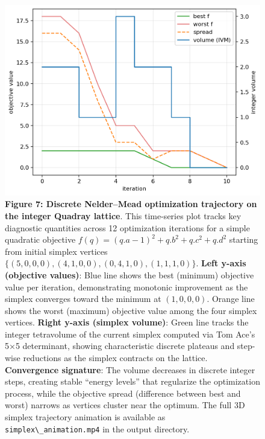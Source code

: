 \documentclass[
  10pt,
]{article}
\newcommand{\passthrough}[1]{#1}
\begin{document}
\begin{figure}
\centering
\includegraphics{../output/figures/simplex_trace.png}
\caption{\textbf{Figure 7: Discrete Nelder--Mead optimization trajectory
on the integer Quadray lattice}. This time-series plot tracks key
diagnostic quantities across 12 optimization iterations for a simple
quadratic objective \(f(q) = (q.a - 1)^2 + q.b^2 + q.c^2 + q.d^2\)
starting from initial simplex vertices
\(\{(5,0,0,0), (4,1,0,0), (0,4,1,0), (1,1,1,0)\}\). \textbf{Left y-axis
(objective values)}: Blue line shows the best (minimum) objective value
per iteration, demonstrating monotonic improvement as the simplex
converges toward the minimum at \((1,0,0,0)\). Orange line shows the
worst (maximum) objective value among the four simplex vertices.
\textbf{Right y-axis (simplex volume)}: Green line tracks the integer
tetravolume of the current simplex computed via Tom Ace's 5×5
determinant, showing characteristic discrete plateaus and step-wise
reductions as the simplex contracts on the lattice. \textbf{Convergence
signature}: The volume decreases in discrete integer steps, creating
stable ``energy levels'' that regularize the optimization process, while
the objective spread (difference between best and worst) narrows as
vertices cluster near the optimum. The full 3D simplex trajectory
animation is available as
\passthrough{\lstinline!simplex\_animation.mp4!} in the output
directory.}
\end{figure}
\end{document}
